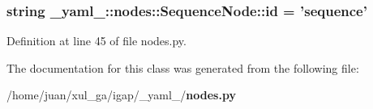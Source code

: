 \subsubsection{\setlength{\rightskip}{0pt plus 5cm}string {\bf \_\-yaml\_\-::nodes::SequenceNode::id} = 'sequence'\hspace{0.3cm}{\tt  [static]}}\label{class__yaml___1_1nodes_1_1SequenceNode_4336df1f5201876856f1c2688a22b241}




Definition at line 45 of file nodes.py.

The documentation for this class was generated from the following file:\begin{CompactItemize}
\item 
/home/juan/xul\_\-ga/igap/\_\-yaml\_\-/{\bf nodes.py}\end{CompactItemize}
